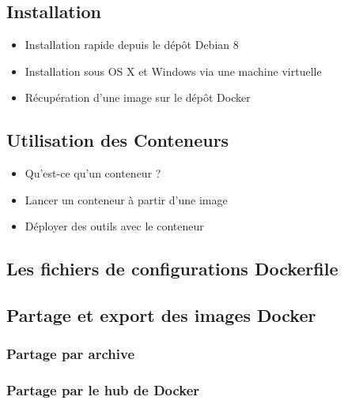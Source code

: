 \documentclass{beamer}
\begin{document}
    \subsection{Installation}
    \begin{frame}
       \begin{itemize}
          \item{Installation rapide depuis le dépôt Debian 8}
          \item{Installation sous OS X et Windows via une machine virtuelle}
          \item{Récupération d'une image sur le dépôt Docker}
       \end{itemize}
    \end{frame}

    \subsection{Utilisation des Conteneurs}
    \begin{frame}
       \begin{itemize}
          \item{Qu'est-ce qu'un conteneur ?}
          \item{Lancer un conteneur à partir d'une image}
          \item{Déployer des outils avec le conteneur}
       \end{itemize}
       \begin{exampleblock}{}
          \em{}
       \end{exampleblock}
    \end{frame}

    \subsection{Les fichiers de configurations Dockerfile}

    \subsection{Partage et export des images Docker}
    \subsubsection{Partage par archive}
    \subsubsection{Partage par le hub de Docker}



\end{document}
